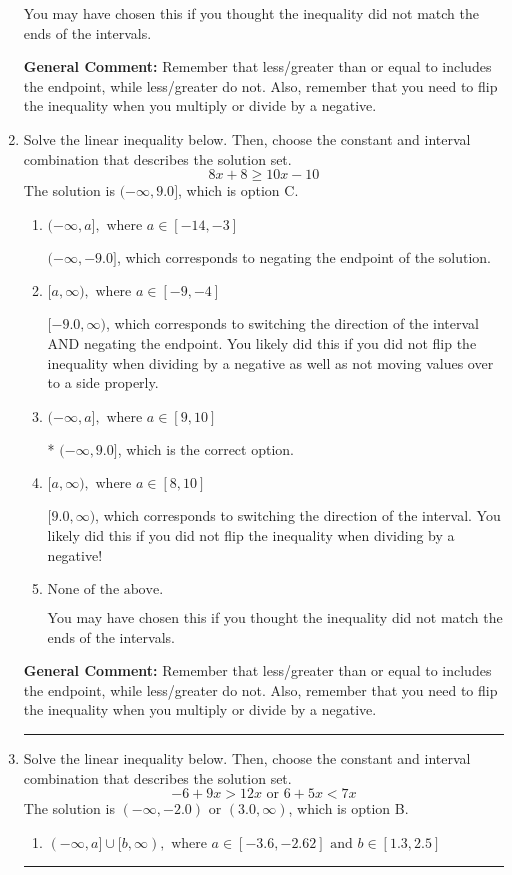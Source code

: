 \documentclass{extbook}[14pt]
\newcommand{\litem}[1]{\item #1

\rule{\textwidth}{0.4pt}}
\begin{document}
\begin{enumerate}
{\begin{enumerate}[label=\Alph*.]
You may have chosen this if you thought the inequality did not match the ends of the intervals.
\end{enumerate}

\textbf{General Comment:} Remember that less/greater than or equal to includes the endpoint, while less/greater do not. Also, remember that you need to flip the inequality when you multiply or divide by a negative.
}
\litem{
Solve the linear inequality below. Then, choose the constant and interval combination that describes the solution set.
\[ 8x + 8 \geq 10x -10 \]The solution is \( (-\infty, 9.0] \), which is option C.\begin{enumerate}[label=\Alph*.]
\item \( (-\infty, a], \text{ where } a \in [-14, -3] \)

 $(-\infty, -9.0]$, which corresponds to negating the endpoint of the solution.
\item \( [a, \infty), \text{ where } a \in [-9, -4] \)

 $[-9.0, \infty)$, which corresponds to switching the direction of the interval AND negating the endpoint. You likely did this if you did not flip the inequality when dividing by a negative as well as not moving values over to a side properly.
\item \( (-\infty, a], \text{ where } a \in [9, 10] \)

* $(-\infty, 9.0]$, which is the correct option.
\item \( [a, \infty), \text{ where } a \in [8, 10] \)

 $[9.0, \infty)$, which corresponds to switching the direction of the interval. You likely did this if you did not flip the inequality when dividing by a negative!
\item \( \text{None of the above}. \)

You may have chosen this if you thought the inequality did not match the ends of the intervals.
\end{enumerate}

\textbf{General Comment:} Remember that less/greater than or equal to includes the endpoint, while less/greater do not. Also, remember that you need to flip the inequality when you multiply or divide by a negative.
}
\litem{
Solve the linear inequality below. Then, choose the constant and interval combination that describes the solution set.
\[ -6 + 9 x > 12 x \text{ or } 6 + 5 x < 7 x \]The solution is \( (-\infty, -2.0) \text{ or } (3.0, \infty) \), which is option B.\begin{enumerate}[label=\Alph*.]
\item \( (-\infty, a] \cup [b, \infty), \text{ where } a \in [-3.6, -2.62] \text{ and } b \in [1.3, 2.5] \)


\end{enumerate}}
\end{enumerate}
\end{document}
